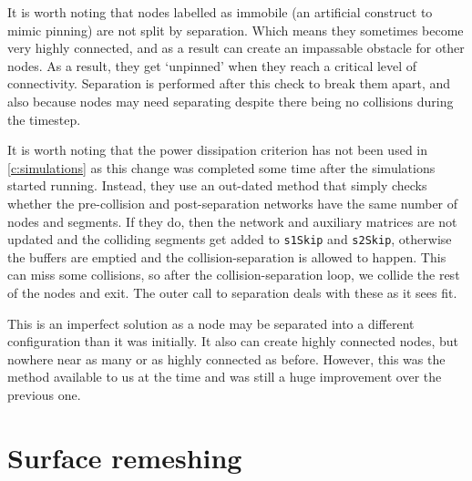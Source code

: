It is worth noting that nodes labelled as immobile (an artificial construct to mimic pinning) are not split by separation. Which means they sometimes become very highly connected, and as a result can create an impassable obstacle for other nodes. As a result, they get `unpinned' when they reach a critical level of connectivity. Separation is performed after this check to break them apart, and also because nodes may need separating despite there being no collisions during the timestep.

It is worth noting that the power dissipation criterion has not been used in \cref{c:simulations} as this change was completed some time after the simulations started running. Instead, they use an out-dated method that simply checks whether the pre-collision and post-separation networks have the same number of nodes and segments. If they do, then the network and auxiliary matrices are not updated and the colliding segments get added to \texttt{s1Skip} and \texttt{s2Skip}, otherwise the buffers are emptied and the collision-separation is allowed to happen. This can miss some collisions, so after the collision-separation loop, we collide the rest of the nodes and exit. The outer call to separation deals with these as it sees fit.

This is an imperfect solution as a node may be separated into a different configuration than it was initially. It also can create highly connected nodes, but nowhere near as many or as highly connected as before. However, this was the method available to us at the time and was still a huge improvement over the previous one.

\section{Surface remeshing}
\label{c:surfRem}

